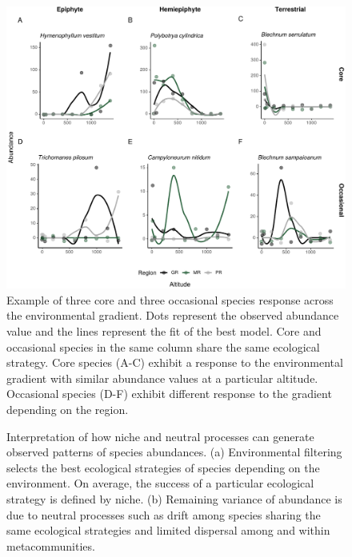 \documentclass[12pt]{article}
\begin{document}
\begin{figure}[!h]
 \begin{center}
\includegraphics[scale=.75]{./fig/core_ocasional_species.pdf}
\end{center}
\caption{Example of three core and three occasional species response across the environmental gradient. Dots represent the observed abundance value and the lines represent the fit of the best model. Core and occasional species in the same column share the same ecological strategy. Core species (A-C) exhibit a response to the environmental gradient with similar abundance values at a particular altitude. Occasional species (D-F) exhibit different response to the gradient depending on the region.} \label{fig:spp}
\end{figure}


\begin{figure}[!ht]
 \begin{center}
\end{center}
\caption{Interpretation of how niche and neutral processes can generate observed patterns of species abundances. (a) Environmental filtering selects the best ecological strategies of species depending on the environment. On average, the success of a particular ecological strategy is defined by niche. (b) Remaining variance of abundance is due to neutral processes such as drift among species sharing the same ecological strategies and limited dispersal among and within metacommunities.} \label{fig:final}
\end{figure}



\end{document}
